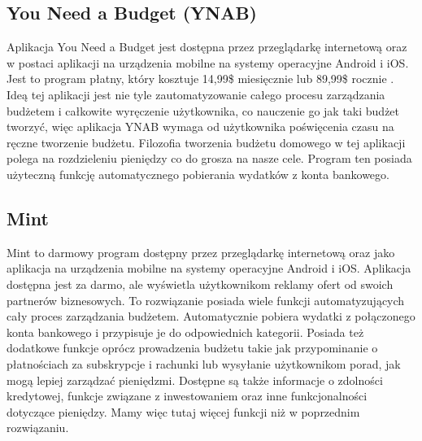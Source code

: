 \documentclass[shortabstract,inz]{iithesis}
\begin{document}
\subsection{You Need a Budget (YNAB)}
Aplikacja You Need a Budget \citep{ynab} jest dostępna przez przeglądarkę internetową oraz w postaci aplikacji na urządzenia mobilne na systemy operacyjne Android i iOS. Jest to program płatny, który kosztuje 14,99\$ miesięcznie lub 89,99\$ rocznie \cite{ynab-price}. Ideą tej aplikacji jest nie tyle zautomatyzowanie całego procesu zarządzania budżetem i całkowite wyręczenie użytkownika, co nauczenie go jak taki budżet tworzyć, więc aplikacja YNAB wymaga od użytkownika poświęcenia czasu na ręczne tworzenie budżetu. Filozofia tworzenia budżetu domowego w tej aplikacji polega na rozdzieleniu pieniędzy co do grosza na nasze cele. Program ten posiada użyteczną funkcję automatycznego pobierania wydatków z konta bankowego.

\subsection{Mint}
Mint \cite{mint} to darmowy program dostępny przez przeglądarkę internetową oraz jako aplikacja na urządzenia mobilne na systemy operacyjne Android i iOS. Aplikacja dostępna jest za darmo, ale wyświetla użytkownikom reklamy ofert od swoich partnerów biznesowych. To rozwiązanie posiada wiele funkcji automatyzujących cały proces zarządzania budżetem. Automatycznie pobiera wydatki z połączonego konta bankowego i przypisuje je do odpowiednich kategorii. Posiada też dodatkowe funkcje oprócz prowadzenia budżetu takie jak przypominanie o płatnościach za subskrypcje i rachunki lub wysyłanie użytkownikom porad, jak mogą lepiej zarządzać pieniędzmi. Dostępne są także informacje o zdolności kredytowej, funkcje związane z inwestowaniem oraz inne funkcjonalności dotyczące pieniędzy. Mamy więc tutaj więcej funkcji niż w poprzednim rozwiązaniu.
\end{document}
